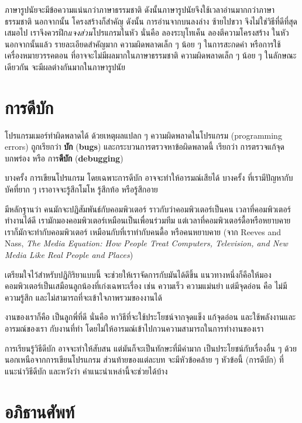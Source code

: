 ภาษารูปนัยจะมีข้อความแน่นกว่าภาษาธรรมชาติ
ดังนั้นภาษารูปนัยจึงใช้เวลาอ่านมากกว่าภาษาธรรมชาติ
นอกจากนั้น โครงสร้างก็สำคัญ
ดังนั้น การอ่านจากบนลงล่าง ซ้ายไปขวา จึงไม่ใช่วิธีที่ดีที่สุดเสมอไป
เราจึงควรฝึก\textit{แจงส่วน}โปรแกรมในหัว
นั่นคือ ลองระบุโทเค็น ลองตีความโครงสร้าง ในหัว
นอกจากนั้นแล้ว รายละเอียดสำคัญมาก
ความผิดพลาดเล็ก ๆ น้อย ๆ ในการสะกดคำ หรือการใช้เครื่องหมายวรรคตอน ที่อาจจะไม่มีผลมากในภาษาธรรมชาติ
ความผิดพลาดเล็ก ๆ น้อย ๆ ในลักษณะเดียวกัน จะมีผลต่างกันมากในภาษารูปนัย

\section{การดีบัก}

โปรแกรมเมอร์ทำผิดพลาดได้
ด้วยเหตุผลแปลก	 ๆ ความผิดพลาดในโปรแกรม (programming errors) ถูกเรียกว่า \textbf{บัก} (\textbf{bugs})
และกระบวนการตรวจหาข้อผิดพลาดนี้ เรียกว่า
การตรวจแก้จุดบกพร่อง หรือ การ\textbf{ดีบัก} (\textbf{debugging})

บางครั้ง การเขียนโปรแกรม โดยเฉพาะการดีบัก อาจจะทำให้อารมณ์เสียได้
บางครั้ง ที่เรามีปัญหากับบัคที่ยาก ๆ
เราอาจจะรู้สึกโมโห รู้สึกท้อ หรือรู้สึกอาย

มีหลักฐานว่า คนมักจะปฏิสัมพันธ์กับคอมพิวเตอร์ ราวกับว่าคอมพิวเตอร์เป็นคน
เวลาที่คอมพิวเตอร์ทำงานได้ดี เรามักมองคอมพิวเตอร์เหมือนเป็นเพื่อนร่วมทีม
แต่เวลาที่คอมพิวเตอร์ดื้อหรือหยาบคาย 
เราก็มักจะทำกับคอมพิวเตอร์ เหมือนกับที่เราทำกับคนดื้อ หรือคนหยาบคาย (จาก Reeves and Nass, \textit{The Media
    Equation: How People Treat Computers, Television, and New Media
    Like Real People and Places})

เตรียมใจไว้สำหรับปฏิกิริยาแบบนี้ จะช่วยให้เราจัดการกับมันได้ดีขึ้น
แนวทางหนึ่งก็คือให้มองคอมพิวเตอร์เป็นเสมือนลูกน้องที่เก่งเฉพาะเรื่อง เช่น ความเร็ว ความแม่นยำ
แต่มีจุดอ่อน คือ ไม่มีความรู้สึก และไม่สามารถที่จะเข้าใจภาพรวมของงานได้

งานของเราก็คือ เป็นลูกพี่ที่ดี
นั่นคือ หาวิธีที่จะใช้ประโยชน์จากจุดแข็ง
แก้จุดอ่อน 
และใช้พลังงานและอารมณ์ของเรา กับงานที่ทำ
โดยไม่ให้อารมณ์เข้าไปกวนความสามารถในการทำงานของเรา

การเรียนรู้วิธีดีบัก อาจจะทำให้สับสน แต่มันก็จะเป็นทักษะที่มีค่ามาก เป็นประโยชน์กับเรื่องอื่น ๆ ด้วย นอกเหนือจากการเขียนโปรแกรม
%
ส่วนท้ายของแต่ละบท จะมีหัวข้อคล้าย ๆ หัวข้อนี้ (การดีบัก) ที่แนะนำวิธีดีบัก และหวังว่า คำแนะนำเหล่านี้จะช่วยได้บ้าง

\section{อภิธานศัพท์}

